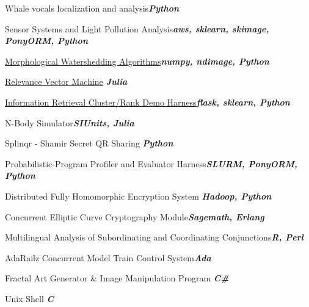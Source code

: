 \documentclass{article}
\newenvironment{**mylist}[2]{
  \subsubsection*{#1\hfill\small#2}
  \small
  \begin{list}{}{}
   \setlength{\topsep}{0pt}
   \setlength{\itemsep}{1pt}
   \setlength{\parskip}{0pt}
   \setlength{\parsep}{0pt}}{\end{list}\normalsize}
\newcommand{\LUx}[1]{{\bf\em #1}}
\begin{document}
\small
\vspace{-.08in}\begin{**mylist}{}{}
\item Whale vocals localization and analysis\hfill\LUx{Python}
\item Sensor Systems and Light Pollution Analysis\hfill\LUx{aws, sklearn, skimage, PonyORM, Python}
\item \href{https://github.com/probinso/morphological-watersheds}{Morphological Watershedding Algorithms}\hfill\LUx{numpy, ndimage, Python}
\item \href{https://github.com/probinso/RVM.jl/blob/master/src/RVM.jl}{Relevance Vector Machine} \hfill\LUx{Julia}
\item \href{https://github.com/probinso/IR-cluster-rank-demo}{Information Retrieval Cluster/Rank Demo Harness}\hfill\LUx{flask, sklearn, Python}
\item N-Body Simulator\hfill\LUx{SIUnits, Julia}
\item Splinqr - Shamir Secret QR Sharing \hfill\LUx{Python}
\item Probabilistic-Program Profiler and Evaluator Harness\hfill\LUx{SLURM, PonyORM, Python}
\item Distributed Fully Homomorphic Encryption System \hfill\LUx{Hadoop, Python}
\item Concurrent Elliptic Curve Cryptography Module\hfill\LUx{Sagemath, Erlang}
\item Multilingual Analysis of Subordinating and Coordinating Conjunctions\hfill\LUx{R, Perl}
\item AdaRailz Concurrent Model Train Control System\hfill\LUx{Ada}
\item Fractal Art Generator \& Image Manipulation Program \hfill\LUx{C\#}
\item Unix Shell \hfill\LUx{C}
\end{**mylist}
\normalsize
\end{document}
